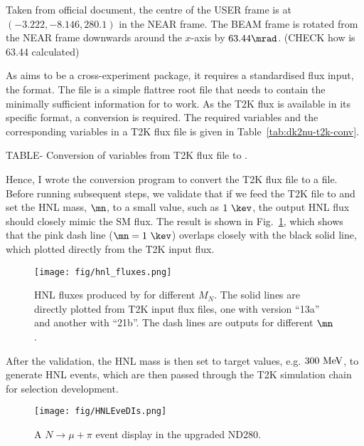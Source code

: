         Taken from official document, the centre of the USER frame is at $(-3.222,-8.146,280.1)$ in the NEAR frame. 
        The BEAM frame is rotated from the NEAR frame downwards around the $x$-axis by $63.44\mrad$. 
        (CHECK how is 63.44 calculated)

        As  aims to be a cross-experiment package, it requires a standardised flux input, the  format. 
        The  file is a simple flattree root file that needs to contain the minimally sufficient information for  to work.
        As the T2K flux is available in its specific format, a conversion is required. 
        The required  variables and the corresponding variables in a T2K flux file is given in Table~\ref{tab:dk2nu-t2k-conv}.

        TABLE- Conversion of variables from T2K flux file to .



        Hence, I wrote the conversion program to convert the T2K flux file to a  file. 
        Before running subsequent steps, we validate that if we feed the T2K  file to  and set the HNL mass, $\mn$, to a small value, such as $1~\kev$, the output HNL flux should closely mimic the SM flux. 
        The result is shown in Fig.~\ref{fig:hnl-fluxes}, which shows that the pink dash line ($\mn=1~\kev$) overlaps closely with the black solid line, which plotted directly from the T2K input flux.  
        \begin{figure}[!htb] 
            \centering 		
            \texttt{[image: fig/hnl\_fluxes.png]}
            \caption{\label{fig:hnl-fluxes} HNL fluxes produced by  for different $M_N$. The solid lines are directly plotted from T2K input flux files, one with version ``13a'' and another with ``21b''. The dash lines are  outputs for different $\mn$.} 
        \end{figure}
        After the validation, the HNL mass is then set to target values, e.g. $300~\textrm{MeV}$, to generate HNL events, which are then passed through the T2K simulation chain for selection development. 
        \begin{figure}[!htb] 
            \centering 		
            \texttt{[image: fig/HNLEveDIs.png]}
            \caption{\label{fig:hnl-evedis} A $N\rightarrow\mu+\pi$ event display in the upgraded ND280.} 
        \end{figure}

